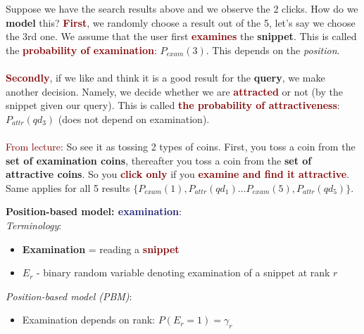 Suppose we have the search results above and we observe the 2 clicks. How do we \textbf{model} this? \textbf{\textcolor{Maroon}{First}}, we randomly choose a result out of the 5, let's say we choose the 3rd one. We assume that the user first \textbf{\textcolor{Maroon}{examines}} the \textbf{snippet}. This is called the \textbf{\textcolor{Maroon}{probability of examination}}: $P_{exam}(3)$. This depends on the \textit{position}. \\
\\
\textbf{\textcolor{Maroon}{Secondly}}, if we like and think it is a good result for the \textbf{query}, we make another decision. Namely, we decide whether we are \textbf{\textcolor{Maroon}{attracted}} or not (by the snippet given our query). This is called \textbf{\textcolor{Maroon}{the probability of attractiveness}}: $P_{attr}(qd_3)$ (does not depend on examination). \\
\\
\textcolor{Maroon}{From lecture}: So see it as tossing 2 types of coins. First, you toss a coin from the \textbf{set of examination coins}, thereafter you toss a coin from the \textbf{set of attractive coins}. So you \textbf{\textcolor{Maroon}{click only}} if you \textbf{\textcolor{Maroon}{examine and find it attractive}}. Same applies for all 5 results $\{P_{exam}(1), P_{attr}(qd_1) \ldots P_{exam}(5), P_{attr}(qd_5)\}$.

\newpage

{\Large \textbf{Position-based model: \textcolor{MidnightBlue}{examination}}}:\\
{\large \textit{Terminology}}:
\begin{itemize}
    \setlength\itemsep{0em}
    \item \textbf{Examination} = reading a \textbf{\textcolor{Maroon}{snippet}}
    \item $E_r$ - binary random variable denoting examination of a snippet at rank $r$
\end{itemize}

{\large \textit{Position-based model (PBM)}}:
\begin{itemize}
    \setlength\itemsep{0em}
    \item Examination depends on rank: $P(E_r = 1) = \gamma_r$
\end{itemize}

